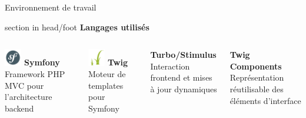 \documentclass{beamer}
\begin{document}
\begin{frame}{Environnement de travail}
	\begin{beamercolorbox}[wd=\paperwidth,ht=1.5em,dp=0.5em,leftskip=0.5cm]{section in head/foot}
  		\large \textbf{Langages utilisés}
	\end{beamercolorbox}
	\vspace{0.5em}
	\begin{center}
		\begin{minipage}{0.9\textwidth}
  			\begin{columns}[T, onlytextwidth]
    
    					\vspace{2.5em}
      				\begin{minipage}[t][2cm][t]{\linewidth}
        					\raggedright
        					\includegraphics[height=0.75cm]{../img/logo_symfony.png}
        					\hspace{0.6cm} \textbf{Symfony} \\
        					Framework PHP MVC pour l'architecture backend
      				\end{minipage}
      				\vspace{0.7em}
      
      				\begin{minipage}[t][2cm][t]{\linewidth}
        					\raggedright
        					\includegraphics[height=0.75cm]{../img/logo_twig.png}
        					\hspace{0.6cm} \textbf{Twig} \\
        					Moteur de templates pour Symfony
      				\end{minipage}

    
      				\begin{minipage}[t][2cm][t]{\linewidth}
        					\raggedright
        					\textbf{Turbo/Stimulus} \\
        					Interaction frontend et mises à jour dynamiques
      				\end{minipage}
      				\vspace{0.7em}
      
      				\begin{minipage}[t][2cm][t]{\linewidth}
        					\raggedright
        					\textbf{Twig Components} \\
        					Représentation réutilisable des éléments d'interface
      				\end{minipage}
      				\vspace{0.7em}
      

\end{columns}
\end{minipage}
\end{center}
\end{frame}
\end{document}

